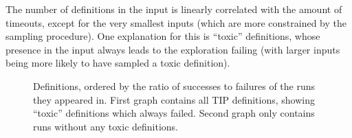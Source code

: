 The number of definitions in the input is linearly correlated with the amount of
timeouts, except for the very smallest inputs (which are more constrained by the
sampling procedure). One explanation for this is ``toxic'' definitions, whose
presence in the input always leads to the exploration failing (with larger
inputs being more likely to have sampled a toxic definition).

\iffalse
\begin{figure}
  \scalebox{0.45}{}
  \scalebox{0.45}{}
  \caption{Proportion of samples which timed out per size, with least-squares
    linear regression. First plot is for all TIP definitions, second removes
    runs given ``toxic'' definitions.}
  \label{fig:tailsize}
\end{figure}
\fi

\begin{figure}
  \scalebox{0.45}{}
  \scalebox{0.45}{}
  \label{fig:proportions}
  \caption{Definitions, ordered by the ratio of successes to failures of the
    runs they appeared in. First graph contains all TIP definitions, showing
    ``toxic'' definitions which always failed. Second graph only contains runs
    without any toxic definitions.}
\end{figure}

